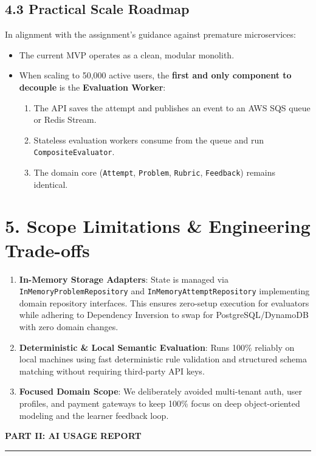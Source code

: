 \documentclass[10pt,a4paper]{article}
\begin{document}
\subsection{4.3 Practical Scale Roadmap}
In alignment with the assignment's guidance against premature microservices:
\begin{itemize}
  \item The current MVP operates as a clean, modular monolith.
  \item When scaling to 50,000 active users, the \textbf{first and only component to decouple} is the \textbf{Evaluation Worker}:
    \begin{enumerate}
      \item The API saves the attempt and publishes an event to an AWS SQS queue or Redis Stream.
      \item Stateless evaluation workers consume from the queue and run \texttt{CompositeEvaluator}.
      \item The domain core (\texttt{Attempt}, \texttt{Problem}, \texttt{Rubric}, \texttt{Feedback}) remains identical.
    \end{enumerate}
\end{itemize}

\section{5. Scope Limitations \& Engineering Trade-offs}
\begin{enumerate}
  \item \textbf{In-Memory Storage Adapters}: State is managed via \texttt{InMemoryProblemRepository} and \texttt{InMemoryAttemptRepository} implementing domain repository interfaces. This ensures zero-setup execution for evaluators while adhering to Dependency Inversion to swap for PostgreSQL/DynamoDB with zero domain changes.
  \item \textbf{Deterministic \& Local Semantic Evaluation}: Runs 100\% reliably on local machines using fast deterministic rule validation and structured schema matching without requiring third-party API keys.
  \item \textbf{Focused Domain Scope}: We deliberately avoided multi-tenant auth, user profiles, and payment gateways to keep 100\% focus on deep object-oriented modeling and the learner feedback loop.
\end{enumerate}

\vspace{1.2em}
{\Large \textbf{\color{secondary}PART II: AI USAGE REPORT}}
\vspace{0.2em}\rule{\textwidth}{0.8pt}
\end{document}
